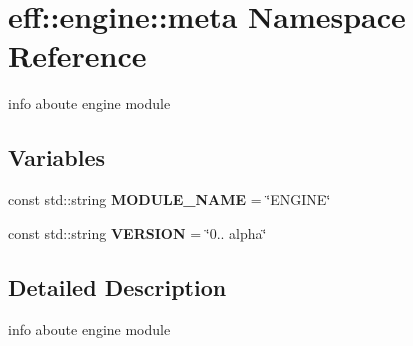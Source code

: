\hypertarget{namespaceeff_1_1engine_1_1meta}{}\section{eff\+:\+:engine\+:\+:meta Namespace Reference}
\label{namespaceeff_1_1engine_1_1meta}


info aboute engine module  


\subsection*{Variables}
\begin{DoxyCompactItemize}
\item 
\mbox{\label{namespaceeff_1_1engine_1_1meta_ac0c8a11b83c29b6c19bd574c3636ab3a}} 
const std\+::string {\bfseries M\+O\+D\+U\+L\+E\+\_\+\+N\+A\+ME} = \char`\"{}E\+N\+G\+I\+NE\char`\"{}
\item 
\mbox{\label{namespaceeff_1_1engine_1_1meta_aa3ae6a3b2d3e50692ac5e621f8f43840}} 
const std\+::string {\bfseries V\+E\+R\+S\+I\+ON} = \char`\"{}0.. alpha\char`\"{}
\end{DoxyCompactItemize}


\subsection{Detailed Description}
info aboute engine module 
